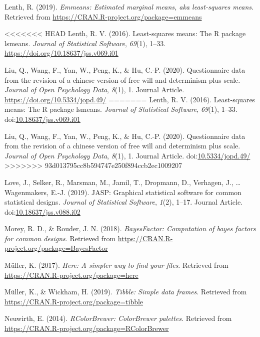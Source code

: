 \documentclass[
  man]{apa6}
\begin{document}
\leavevmode\hypertarget{ref-R-emmeans}{}%
Lenth, R. (2019). \emph{Emmeans: Estimated marginal means, aka least-squares means}. Retrieved from \url{https://CRAN.R-project.org/package=emmeans}

\leavevmode\hypertarget{ref-R-lsmeans}{}%
<<<<<<< HEAD
Lenth, R. V. (2016). Least-squares means: The R package lsmeans. \emph{Journal of Statistical Software}, \emph{69}(1), 1--33. \url{https://doi.org/10.18637/jss.v069.i01}

\leavevmode\hypertarget{ref-Liu_2020_JOPD}{}%
Liu, Q., Wang, F., Yan, W., Peng, K., \& Hu, C.-P. (2020). Questionnaire data from the revision of a chinese version of free will and determinism plus scale. \emph{Journal of Open Psychology Data}, \emph{8}(1), 1. Journal Article. \url{https://doi.org/10.5334/jopd.49/}
=======
Lenth, R. V. (2016). Least-squares means: The R package lsmeans. \emph{Journal of Statistical Software}, \emph{69}(1), 1--33. doi:\href{https://doi.org/10.18637/jss.v069.i01}{10.18637/jss.v069.i01}

\leavevmode\hypertarget{ref-Liu_2020_JOPD}{}%
Liu, Q., Wang, F., Yan, W., Peng, K., \& Hu, C.-P. (2020). Questionnaire data from the revision of a chinese version of free will and determinism plus scale. \emph{Journal of Open Psychology Data}, \emph{8}(1), 1. Journal Article. doi:\href{https://doi.org/10.5334/jopd.49/}{10.5334/jopd.49/}
>>>>>>> 93d013795cc8b594747e250f894ccb2ec1009207

\leavevmode\hypertarget{ref-Love_etal_2019_JASP}{}%
Love, J., Selker, R., Marsman, M., Jamil, T., Dropmann, D., Verhagen, J., \ldots{} Wagenmakers, E.-J. (2019). JASP: Graphical statistical software for common statistical designs. \emph{Journal of Statistical Software}, \emph{1}(2), 1--17. Journal Article. doi:\href{https://doi.org/10.18637/jss.v088.i02}{10.18637/jss.v088.i02}

\leavevmode\hypertarget{ref-R-BayesFactor}{}%
Morey, R. D., \& Rouder, J. N. (2018). \emph{BayesFactor: Computation of bayes factors for common designs}. Retrieved from \url{https://CRAN.R-project.org/package=BayesFactor}

\leavevmode\hypertarget{ref-R-here}{}%
Müller, K. (2017). \emph{Here: A simpler way to find your files}. Retrieved from \url{https://CRAN.R-project.org/package=here}

\leavevmode\hypertarget{ref-R-tibble}{}%
Müller, K., \& Wickham, H. (2019). \emph{Tibble: Simple data frames}. Retrieved from \url{https://CRAN.R-project.org/package=tibble}

\leavevmode\hypertarget{ref-R-RColorBrewer}{}%
Neuwirth, E. (2014). \emph{RColorBrewer: ColorBrewer palettes}. Retrieved from \url{https://CRAN.R-project.org/package=RColorBrewer}
\end{document}
